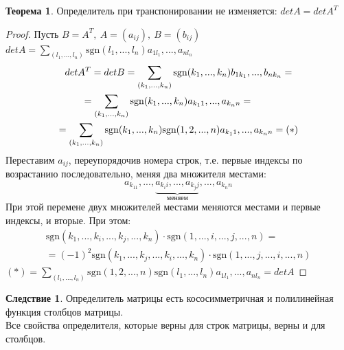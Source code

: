 \documentclass[a4paper, 12pt]{article}
\newcommand\tab[1][.5cm]{\hspace*{#1}}
\newcounter{thcount}
\theoremstyle{definition}
\newtheorem*{consequense}{Следствие}
\newtheorem{theoremnum}[thcount]{Теорема}
\begin{document}
  \begin{theoremnum}
    Определитель при транспонировании не изменяется: $detA = detA^T$
  \end{theoremnum} 

  \begin{proof}
    Пусть $B = A^T, \ A=(a_{ij}), \ B=(b_{ij})$ \\
    $detA = \sum \limits_{(l_1,...,l_n)}\textrm{sgn}(l_1,...,l_n)a_{1l_1},...,a_{nl_n}$
    \begin{multline*}
      detA^T = detB = \sum \limits_{(k_1,...,k_n)}\textrm{sgn}(k_1,...,k_n)b_{1k_1},...,b_{nk_n} = \\
      = \sum \limits_{(k_1,...,k_n)}\textrm{sgn}(k_1,...,k_n)a_{k_11},...,a_{k_nn} = \tab[0.8cm]\\ 
      = \sum \limits_{(k_1,...,k_n)}\textrm{sgn}(k_1,...,k_n) \textrm{sgn}(1,2,...,n)a_{k_11},...,a_{k_nn} = (*)
    \end{multline*} 
    Переставим $a_{ij}$, переупорядочив номера строк, т.е. первые индексы по возрастанию последовательно, меняя два множителя местами: $$a_{k_11},...,\underbrace{a_{k_ii},...,a_{k_jj}}_{\text{меняем}},...,a_{k_nn}$$ 
    При этой перемене двух множителей местами меняются местами и первые индексы, и вторые. При этом: 
    \begin{multline*}
      \textrm{sgn}(k_1,...,k_i,...,k_j,...,k_n) \cdot \textrm{sgn}(1,...,i,...,j,...,n) = \\ = (-1)^2 \textrm{sgn}(k_1,...,k_j,...,k_i,...,k_n)\cdot \textrm{sgn}(1,...,j,...,i,...,n)
    \end{multline*}
    $(*) = \sum \limits_{(l_1,...,l_n)} \textrm{sgn}(1,2,...,n) \textrm{sgn}(l_1,...,l_n) a_{1l_1},...,a_{nl_n} = detA$
  \end{proof} 
  \begin{consequense}
    Определитель матрицы есть кососимметричная и полилинейная функция столбцов матрицы. \\
    Все свойства определителя, которые верны для строк матрицы, верны и для столбцов.
  \end{consequense} 
\end{document}
